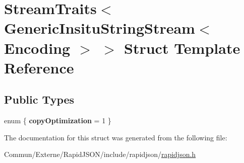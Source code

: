 \hypertarget{struct_stream_traits_3_01_generic_insitu_string_stream_3_01_encoding_01_4_01_4}{}\section{Stream\+Traits$<$ Generic\+Insitu\+String\+Stream$<$ Encoding $>$ $>$ Struct Template Reference}
\label{struct_stream_traits_3_01_generic_insitu_string_stream_3_01_encoding_01_4_01_4}
\subsection*{Public Types}
\begin{DoxyCompactItemize}
\item 
enum \{ {\bfseries copy\+Optimization} = 1
 \}\hypertarget{struct_stream_traits_3_01_generic_insitu_string_stream_3_01_encoding_01_4_01_4_ac1ef49a8b4d23348553d6aa93efb7746}{}\label{struct_stream_traits_3_01_generic_insitu_string_stream_3_01_encoding_01_4_01_4_ac1ef49a8b4d23348553d6aa93efb7746}

\end{DoxyCompactItemize}


The documentation for this struct was generated from the following file\+:\begin{DoxyCompactItemize}
\item 
Commun/\+Externe/\+Rapid\+J\+S\+O\+N/include/rapidjson/\hyperlink{rapidjson_8h}{rapidjson.\+h}\end{DoxyCompactItemize}
